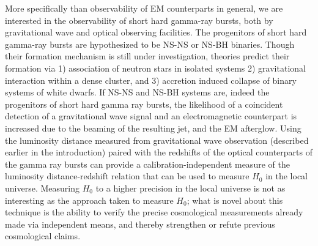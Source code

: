 \documentclass{article}
\begin{document}
More specifically than observability of EM counterparts in general, we are interested in the observability of short hard gamma-ray bursts, both by gravitational wave and optical observing facilities.  The progenitors of short hard gamma-ray bursts are hypothesized to be NS-NS or NS-BH binaries.  Though their formation mechanism is still under investigation, theories predict their formation via 1) association of neutron stars in isolated systems 2) gravitational interaction within a dense cluster, and 3) accretion induced collapse of binary systems of white dwarfs.  If NS-NS and NS-BH systems are, indeed the progenitors of short hard gamma ray bursts, the likelihood of a coincident detection of a gravitational wave signal and an electromagnetic counterpart is increased due to the beaming of the resulting jet, and the EM afterglow.  Using the luminosity distance measured from gravitational wave observation (described earlier in the introduction) paired with the redshifts of the optical counterparts of the gamma ray bursts can provide a calibration-independent measure of the luminosity distance-redshift relation that can be used to measure $H_0$ in the local universe.  Measuring $H_{0}$ to a higher precision in the local universe is not as interesting as the approach taken to measure $H_{0}$; what is novel about this technique is the ability to verify the precise cosmological measurements already made via independent means, and thereby strengthen or refute previous cosmological claims. 
\end{document}
